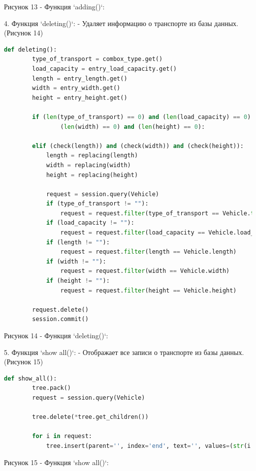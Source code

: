\documentclass[14pt]{extreport}
\begin{document}
   \begin{center}
    Рисунок 13 - Функция `adding()`:
\end{center}
4. Функция `deleting()`:
   - Удаляет информацию о транспорте из базы данных. (Рисунок 14)
   \begin{lstlisting}[language=Python]
    def deleting():
        type_of_transport = combox_type.get()
        load_capacity = entry_load_capacity.get()
        length = entry_length.get()
        width = entry_width.get()
        height = entry_height.get()

        if (len(type_of_transport) == 0) and (len(load_capacity) == 0) and (len(length) == 0) and \
                (len(width) == 0) and (len(height) == 0):

        elif (check(length)) and (check(width)) and (check(height)):
            length = replacing(length)
            width = replacing(width)
            height = replacing(height)

            request = session.query(Vehicle)
            if (type_of_transport != ""):
                request = request.filter(type_of_transport == Vehicle.type)
            if (load_capacity != ""):
                request = request.filter(load_capacity == Vehicle.load_capacity)
            if (length != ""):
                request = request.filter(length == Vehicle.length)
            if (width != ""):
                request = request.filter(width == Vehicle.width)
            if (height != ""):
                request = request.filter(height == Vehicle.height)

        request.delete()
        session.commit()
   \end{lstlisting}
   \begin{center}
    Рисунок 14 - Функция `deleting()`:
\end{center}
5. Функция `show all()`:
   - Отображает все записи о транспорте из базы данных. (Рисунок 15)
   \begin{lstlisting}[language=Python]
    def show_all():
        tree.pack()
        request = session.query(Vehicle)

        tree.delete(*tree.get_children())

        for i in request:
            tree.insert(parent='', index='end', text='', values=(str(i.id), i.type, str(i.load_capacity), i.length, i.width, i.height))
   \end{lstlisting}
   \begin{center}
    Рисунок 15 - Функция `show all()`:
\end{center}
\end{document}
